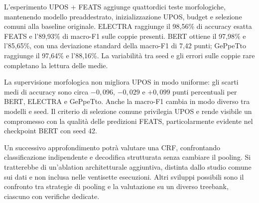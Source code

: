 \documentclass[12pt,a4paper]{report}
\begin{document}
L'esperimento UPOS + FEATS aggiunge quattordici teste morfologiche, mantenendo modello preaddestrato, inizializzazione UPOS, budget e selezione comuni alla baseline originale. ELECTRA raggiunge il 98,56\% di accuracy esatta FEATS e l'89,93\% di macro-F1 sulle coppie presenti. BERT ottiene il 97,98\% e l'85,65\%, con una deviazione standard della macro-F1 di 7,42 punti; GePpeTto raggiunge il 97,64\% e l'88,16\%. La variabilità tra seed e gli errori sulle coppie rare completano la lettura delle medie.

La supervisione morfologica non migliora UPOS in modo uniforme: gli scarti medi di accuracy sono circa $-0{,}096$, $-0{,}029$ e $+0{,}099$ punti percentuali per BERT, ELECTRA e GePpeTto. Anche la macro-F1 cambia in modo diverso tra modelli e seed. Il criterio di selezione comune privilegia UPOS e rende visibile un compromesso con la qualità delle predizioni FEATS, particolarmente evidente nel checkpoint BERT con seed 42.

Un successivo approfondimento potrà valutare una CRF, confrontando classificazione indipendente e decodifica strutturata senza cambiare il pooling. Si tratterebbe di un'ablation architetturale aggiuntiva, distinta dallo studio comune sui dati e non inclusa nelle ventisette esecuzioni. Altri sviluppi possibili sono il confronto tra strategie di pooling e la valutazione su un diverso treebank, ciascuno con verifiche dedicate.

\clearpage
{}
{}

{\footnotesize\raggedright\setlength{\parskip}{0pt}}
\end{document}

